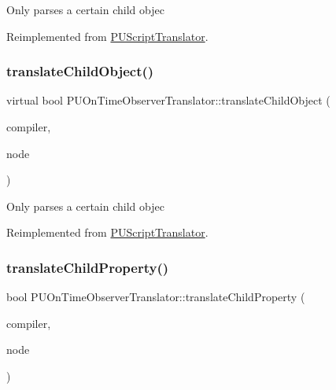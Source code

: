 Only parses a certain child objec 

Reimplemented from \hyperlink{classPUScriptTranslator_ab587d01348ae3e678cb700c719b2b113}{P\+U\+Script\+Translator}.

\mbox{\label{classPUOnTimeObserverTranslator_a7f6f184ecdd74fd0f11780aef6ddba90}} 
\subsubsection{\texorpdfstring{translate\+Child\+Object()}{translateChildObject()}\hspace{0.1cm}{\footnotesize\ttfamily [2/2]}}
{\footnotesize\ttfamily virtual bool P\+U\+On\+Time\+Observer\+Translator\+::translate\+Child\+Object (\begin{DoxyParamCaption}\item[{\hyperlink{classPUScriptCompiler}{P\+U\+Script\+Compiler} $\ast$}]{compiler,  }\item[{\hyperlink{classPUAbstractNode}{P\+U\+Abstract\+Node} $\ast$}]{node }\end{DoxyParamCaption})\hspace{0.3cm}{\ttfamily [virtual]}}

Only parses a certain child objec 

Reimplemented from \hyperlink{classPUScriptTranslator_ab587d01348ae3e678cb700c719b2b113}{P\+U\+Script\+Translator}.

\mbox{\label{classPUOnTimeObserverTranslator_aa509cad026a33279d1d3ec0ab319b14e}} 
\subsubsection{\texorpdfstring{translate\+Child\+Property()}{translateChildProperty()}\hspace{0.1cm}{\footnotesize\ttfamily [1/2]}}
{\footnotesize\ttfamily bool P\+U\+On\+Time\+Observer\+Translator\+::translate\+Child\+Property (\begin{DoxyParamCaption}\item[{\hyperlink{classPUScriptCompiler}{P\+U\+Script\+Compiler} $\ast$}]{compiler,  }\item[{\hyperlink{classPUAbstractNode}{P\+U\+Abstract\+Node} $\ast$}]{node }\end{DoxyParamCaption})\hspace{0.3cm}{\ttfamily [virtual]}}

